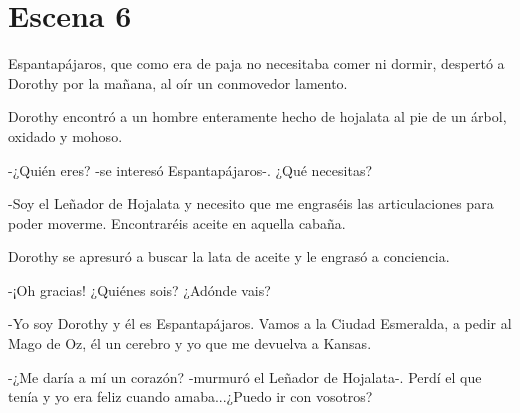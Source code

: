 \chapter{Escena 6}
Espantapájaros, que como era de paja no necesitaba comer ni dormir, despertó a Dorothy por la mañana, al oír un conmovedor lamento.

Dorothy encontró a un hombre enteramente hecho de hojalata al pie de un árbol, oxidado y mohoso.

-¿Quién eres? -se interesó Espantapájaros-. ¿Qué necesitas?

-Soy el Leñador de Hojalata y necesito que me engraséis las articulaciones para poder moverme. Encontraréis aceite en aquella cabaña.

Dorothy se apresuró a buscar la lata de aceite y le engrasó a conciencia.

-¡Oh gracias! ¿Quiénes sois? ¿Adónde vais?

-Yo soy Dorothy y él es Espantapájaros. Vamos a la Ciudad Esmeralda, a pedir al Mago de Oz, él un cerebro y yo que me devuelva a Kansas.

-¿Me daría a mí un corazón? -murmuró el Leñador de Hojalata-. Perdí el que tenía y yo era feliz cuando amaba...¿Puedo ir con vosotros?